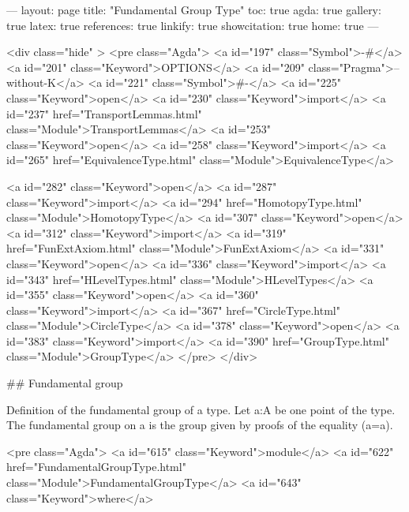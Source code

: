 ---
layout: page
title: "Fundamental Group Type"
toc: true
agda: true
gallery: true
latex: true
references: true
linkify: true
showcitation: true
home: true
---


<div class="hide" >
<pre class="Agda">
<a id="197" class="Symbol">{-#</a> <a id="201" class="Keyword">OPTIONS</a> <a id="209" class="Pragma">--without-K</a> <a id="221" class="Symbol">#-}</a>
<a id="225" class="Keyword">open</a> <a id="230" class="Keyword">import</a> <a id="237" href="TransportLemmas.html" class="Module">TransportLemmas</a>
<a id="253" class="Keyword">open</a> <a id="258" class="Keyword">import</a> <a id="265" href="EquivalenceType.html" class="Module">EquivalenceType</a>

<a id="282" class="Keyword">open</a> <a id="287" class="Keyword">import</a> <a id="294" href="HomotopyType.html" class="Module">HomotopyType</a>
<a id="307" class="Keyword">open</a> <a id="312" class="Keyword">import</a> <a id="319" href="FunExtAxiom.html" class="Module">FunExtAxiom</a>
<a id="331" class="Keyword">open</a> <a id="336" class="Keyword">import</a> <a id="343" href="HLevelTypes.html" class="Module">HLevelTypes</a>
<a id="355" class="Keyword">open</a> <a id="360" class="Keyword">import</a> <a id="367" href="CircleType.html" class="Module">CircleType</a>
<a id="378" class="Keyword">open</a> <a id="383" class="Keyword">import</a> <a id="390" href="GroupType.html" class="Module">GroupType</a>
</pre>
</div>

## Fundamental group

Definition of the fundamental group of a type.
Let a:A be one point of the type. The fundamental group on a is the
group given by proofs of the equality (a=a).

<pre class="Agda">
<a id="615" class="Keyword">module</a> <a id="622" href="FundamentalGroupType.html" class="Module">FundamentalGroupType</a> <a id="643" class="Keyword">where</a>

